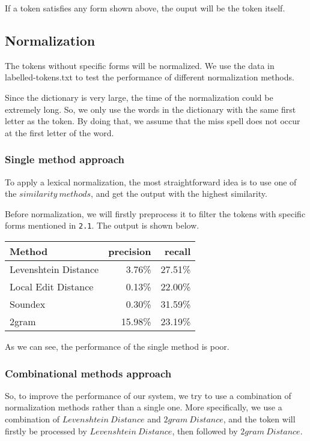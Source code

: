 \documentclass[11pt]{article}
\begin{document}
If a token satisfies any form shown above, the ouput will be the token itself.

\subsection{Normalization}
The tokens without specific forms will be normalized.
We use the data in labelled-tokens.txt to test the performance
of different normalization methods.

Since the dictionary is very large,
the time of the normalization could be extremely long.
So, we only use the words in the dictionary with the same first letter as the token.
By doing that,
we assume that the miss spell does not occur at the first letter of the word.\cite{ir}

\subsubsection{Single method approach}
To apply a lexical normalization, the most straightforward idea
is to use one of the $similarity \ methods$,
and get the output with the highest similarity.

Before normalization, we will firstly preprocess it to filter the tokens
with specific forms mentioned in \texttt{2.1}.
The output is shown below.

\begin{center}
    \begin{tabular}{|l|r|r|}
      \hline
      Method  & precision & recall\\
      \hline
      Levenshtein Distance & 3.76\% & 27.51\%\\
      \hline
      Local Edit Distance & 0.13\% & 22.00\%\\
      \hline
      Soundex   & 0.30\% & 31.59\%\\
      \hline
      2gram & 15.98\% & 23.19\%\\
      \hline
    \end{tabular}
\end{center}

As we can see, the performance of the single method is poor.

\subsubsection{Combinational methods approach}
So, to improve the performance of our system, we try to
use a combination of normalization methods rather than a single one.
More specifically, we use a combination of $Levenshtein \ Distance$\cite{editdistance}
and $2gram \ Distance$\cite{ngram},
and the token will firstly be processed by $Levenshtein \ Distance$, then
followed by $2gram \ Distance$.
\end{document}

